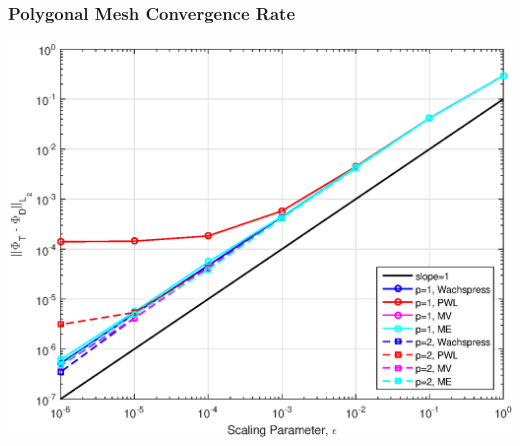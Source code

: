 \documentclass[compress,10pt]{beamer}
\begin{document}
\begin{frame}[t]
{\begin{columns}
\end{columns}
}
{
\frametitle{Polygonal Mesh Convergence Rate}
\centering
{}\includegraphics[width=0.80\columnwidth]{images/DLConvergenceError_SqPoly.eps}
}
\end{frame}
\end{document}
